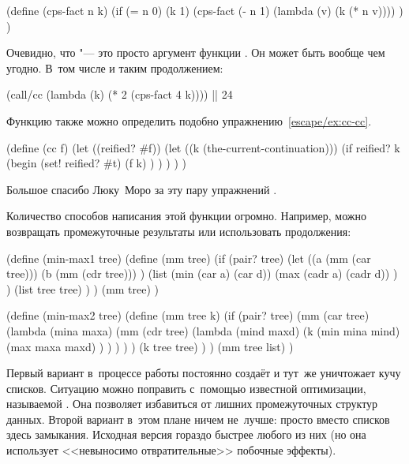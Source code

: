 \begin{code:lisp}
(define (cps-fact n k)
  (if (= n 0) (k 1)
      (cps-fact (- n 1) (lambda (v) (k (* n v)))) ) )
\end{code:lisp}

Очевидно, что  "--- это просто аргумент функции . Он может
быть вообще чем угодно. В~том числе и таким продолжением:

\begin{code:lisp}
(call/cc (lambda (k) (* 2 (cps-fact 4 k)))) |\is| 24
\end{code:lisp}



Функцию  также можно определить подобно
упражнению~\ref{escape/ex:cc-cc}.

\begin{code:lisp}
(define (cc f)
  (let ((reified? #f))
    (let ((k (the-current-continuation)))
      (if reified? k
          (begin (set! reified? #t)
                 (f k) ) ) ) ) )
\end{code:lisp}

Большое спасибо Люку~Моро за эту пару упражнений \cite{mor94}.




Количество способов написания этой функции огромно. Например, можно возвращать
промежуточные результаты или использовать продолжения:

\begin{code:lisp}
(define (min-max1 tree)
  (define (mm tree)
    (if (pair? tree)
        (let ((a (mm (car tree)))
              (b (mm (cdr tree))) )
          (list (min (car a) (car d))
                (max (cadr a) (cadr d)) ) )
        (list tree tree) ) )
  (mm tree) )

(define (min-max2 tree)
  (define (mm tree k)
    (if (pair? tree)
        (mm (car tree)
            (lambda (mina maxa)
              (mm (cdr tree)
                  (lambda (mind maxd)
                    (k (min mina mind)
                       (max maxa maxd) ) ) ) ) )
        (k tree tree) ) )
  (mm tree list) )
\end{code:lisp}

Первый вариант в~процессе работы постоянно создаёт и тут~же уничтожает кучу
списков. Ситуацию можно поправить с~помощью известной оптимизации, называемой
 \cite{wad88}. Она позволяет избавиться от лишних
промежуточных структур данных. Второй вариант в~этом плане ничем не~лучше:
просто вместо списков здесь замыкания. Исходная версия гораздо быстрее любого из
них (но она использует <<невыносимо отвратительные>> побочные эффекты).



